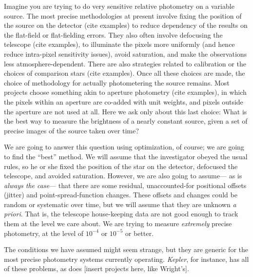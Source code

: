 \documentclass[12pt, letterpaper, preprint]{aastex}
\newcommand{\project}[1]{\textsl{#1}}
\newcommand{\foreign}[1]{\textsl{#1}}
\begin{document}
Imagine you are trying to do very sensitive relative photometry on a variable source.
The most precise methodologies at present involve fixing the position of the source on the detector
  (cite examples)
  to reduce dependency of the results on the flat-field or flat-fielding errors.
They also often involve defocusing the telescope
  (cite examples),
  to illuminate the pixels more uniformly
  (and hence reduce intra-pixel sensitivity issues),
  avoid saturation,
  and make the observations less atmosphere-dependent.
There are also strategies related to calibration or the choices of comparison stars
  (cite examples).
Once all these choices are made,
  the choice of methodology for actually photometering the source remains.
Most projects choose something akin to aperture photometry
  (cite examples),
  in which the pixels within an aperture are co-added with unit weights,
  and pixels outside the aperture are not used at all.
Here we ask only about this last choice:
What is the best way to measure the brightness of a nearly constant source,
  given a set of precise images of the source taken over time?

We are going to answer this question using optimization, of course;
  we are going to find the ``best'' method.
We will assume that the investigator obeyed the usual rules,
  so he or she fixed the position of the star on the detector,
  defocused the telescope,
  and avoided saturation.
However, we are also going to assume---%
  as is \emph{always the case}---%
  that there are some residual,
  unaccounted-for positional offsets (jitter) and point-spread-function changes.
These offsets and changes could be random or systematic over time,
  but we will assume that they are unknown \foreign{a priori}.
That is, the telescope house-keeping data are not good enough to track them at the level we care about.
We are trying to measure \emph{extremely} precise photometry,
  at the level of $10^{-4}$ or $10^{-5}$ or better.

The conditions we have assumed might seem strange,
  but they are generic for the most precise photometry systems currently operating.
\project{Kepler}, for instance, has all of these problems,
  as does [insert projects here, like Wright's].

\end{document}
